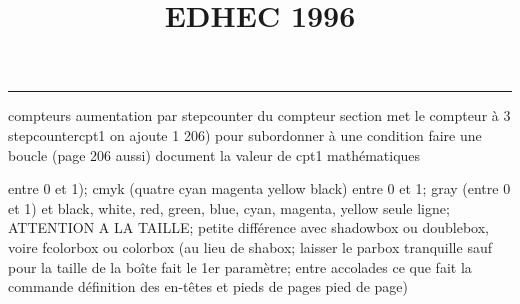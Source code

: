 \documentclass[11pt]{article}%
\title{\bf \vspace{-2cm} EDHEC 1996} %
\author{} %
\date{} %
\renewcommand{\headrulewidth}{0pt}%
\renewcommand{\footrulewidth}{0.4pt}%
\begin{document}
\maketitle %
\vspace{-1.4cm}\hrule %
\thispagestyle{fancy}

\vspace*{.2cm}



compteurs%
aumentation par stepcounter du compteur section%
met le compteur à 3%
stepcounter{cpt1} on ajoute 1%
206) pour subordonner à une condition %
faire une boucle (page 206 aussi) %
document la valeur de cpt1 
mathématiques\newcommand{\ch}{\operatorname{ch}} 
\newcommand{\sh}{\operatorname{sh}}
\renewcommand{\tanh}{\operatorname{th}}
\renewcommand{\sinh}{\operatorname{sh}}
\renewcommand{\cosh}{\operatorname{ch}}
\newcommand{\argsh}{\operatorname{argsh}}
\newcommand{\argch}{\operatorname{argch}}
\newcommand{\argth}{\operatorname{argth}}
\newcommand{\ker}{\operatorname{Ker}}
\renewcommand{\im}{\operatorname{Im}}
\newcommand{\rg}{\operatorname{rg}}
\newcommand{\Id}{\operatorname{Id}}
\newcommand{\id}{\operatorname{id}}
\renewcommand{\leq}{\leq}
\renewcommand{\geq}{\geq }

entre 0 et 1); cmyk (quatre cyan magenta yellow black) entre 0 et 1;
gray (entre 0 et 1) et black, white, red, green, blue, cyan, magenta,
yellow%
seule ligne; ATTENTION A LA TAILLE; petite différence avec shadowbox ou
doublebox, voire fcolorbox ou colorbox (au lieu de shabox; laisser le
parbox tranquille sauf pour la taille de la boîte
\newcommand{\Tbox}[1]{\begin{center} \shabox{\parbox{0.6
\linewidth}{#1}} \end{center}} %
fait le 1er paramètre; entre accolades ce que fait la commande
définition des en-têtes et pieds de pages\pagestyle{fancy}
\chead{}
\rfoot[ \ \thepage]{\thepage}
\cfoot{}
\lfoot{}
\thispagestyle{fancy} %
pied de page)\renewcommand{\footrulewidth}{0.4pt}
\renewcommand{\headrulewidth}{0.4pt}
\end{document}
